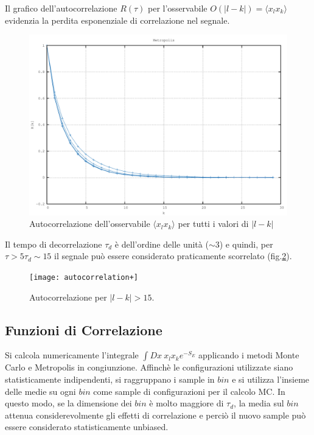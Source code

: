 Il grafico dell'autocorrelazione $R(\tau)$ per l'osservabile $O(|l-k|)=\langle x_lx_k\rangle$ evidenzia la perdita esponenziale di correlazione nel segnale.
\begin{figure}[H]
\centering
\includegraphics[width=\textwidth]{autocorrelation}
\caption{Autocorrelazione dell'osservabile $\langle x_lx_k\rangle$ per tutti i valori di $|l-k|$}
\label{fig:autocorrelation}
\end{figure}
Il tempo di decorrelazione $\tau_d$ è dell'ordine delle unità ($\sim3$) e quindi, per $\tau>5\tau_d\sim15$ il segnale può essere considerato praticamente scorrelato (fig.\ref{fig:autocorrelation+}).
\begin{figure}[H]
\centering
\texttt{[image: autocorrelation+]}
\caption{Autocorrelazione per $|l-k|>15$.}
\label{fig:autocorrelation+}
\end{figure}

\subsection{Funzioni di Correlazione}

Si calcola numericamente l'integrale $\int Dx \ x_lx_ke^{-S_E}$ applicando i metodi Monte Carlo e Metropolis in congiunzione. Affinchè le configurazioni utilizzate siano statisticamente indipendenti, si raggruppano i sample in $bin$ e si utilizza l'insieme delle medie su ogni $bin$ come sample di configurazioni per il calcolo MC. In questo modo, se la dimensione dei $bin$ è molto maggiore di $\tau_d$, la media sul $bin$ attenua considerevolmente gli effetti di correlazione e perciò il nuovo sample può essere considerato statisticamente unbiased.
\\

